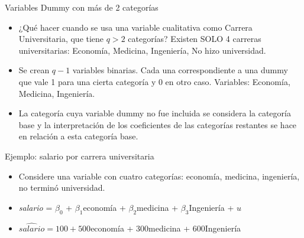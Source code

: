 \documentclass{beamer}
\begin{document}
\begin{frame}{Variables Dummy con más de 2 categorías}
\begin{itemize}
    \item ¿Qué hacer cuando se usa una variable cualitativa como Carrera Universitaria, que tiene \(q > 2\) categorías? Existen SOLO 4 carreras universitarias: Economía, Medicina, Ingeniería, No hizo universidad.
    \item Se crean \(q - 1\) variables binarias. Cada una correspondiente a una dummy que vale 1 para una cierta categoría y 0 en otro caso. Variables: Economía, Medicina, Ingeniería.
    \item La categoría cuya variable dummy no fue incluida se considera la categoría base y la interpretación de los coeficientes de las categorías restantes se hace en relación a esta categoría base.
\end{itemize}
\end{frame}
\begin{frame}[shrink=10, t]{Ejemplo: salario por carrera universitaria}
    \begin{itemize}
        \item Considere una variable con cuatro categorías: economía, medicina, ingeniería, no terminó universidad.
        \item \textit{salario} = \(\beta_0\) + \(\beta_1\)economía + \(\beta_2\)medicina + \(\beta_3\)Ingeniería + \(u\)
        \item \(\hat{salario} = 100 + 500\)economía + 300medicina + 600Ingeniería
    \end{itemize}
\end{frame}
\end{document}
